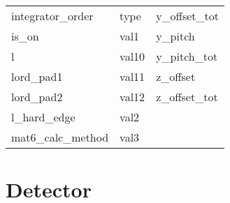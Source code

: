 \begin{tabular}{lll}
integrator_order            & type                        & y_offset_tot                \\
is_on                       & val1                        & y_pitch                     \\
l                           & val10                       & y_pitch_tot                 \\
lord_pad1                   & val11                       & z_offset                    \\
lord_pad2                   & val12                       & z_offset_tot                \\
l_hard_edge                 & val2                        &                             \\
mat6_calc_method            & val3                        &                             \\
 \bottomrule
 \end{tabular}
 \vfill
 
 \section{Detector}
 \label{s:list.detector}
 
